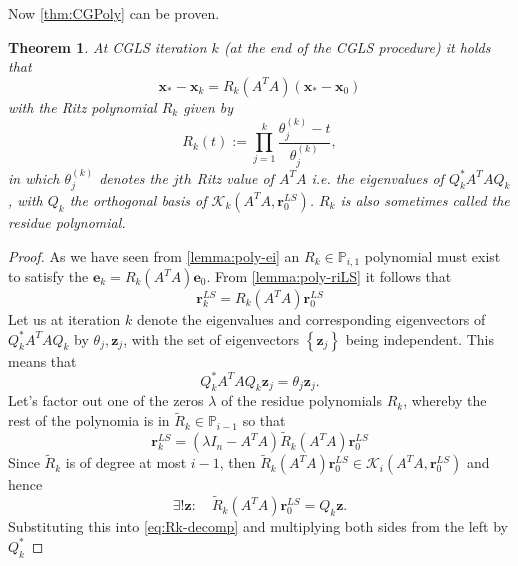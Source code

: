 \documentclass{article}
\newcommand{\mbf}[1]{\mathbf{#1}}
\newtheorem{theorem}{Theorem}
\begin{document}
	Now \autoref{thm:CGPoly} can be proven.
	\begin{theorem}\label{thm:CGPoly}
		At CGLS iteration $k$ (at the end of the CGLS procedure) it holds that
		$$\mathbf{x}_{\ast}-\mathbf{x}_k=R_k(A^TA)(\mathbf{x}_{\ast}-\mbf{x}_0)$$
		with the \emph{Ritz polynomial} $R_k$ given by
		$$R_k(t):=\prod_{j=1}^{k}\frac{\theta_j^{(k)}-t}{\theta_j^{(k)}},$$
		in which $\theta_j^{(k)}$ denotes the $jth$ Ritz value of $A^{T}A$ i.e. the eigenvalues of $Q_k^{\ast}A^{T}AQ_k$, with $Q_k$ the orthogonal basis of $\mathcal{K}_k(A^{T}A,\mathbf{r}_0^{LS})$. $R_k$ is also sometimes called the residue polynomial.
	\end{theorem}
	\begin{proof}
		As we have seen from \autoref{lemma:poly-ei} an $R_k\in \mathbb{P}_{i,1}$ polynomial must exist to satisfy the $\textbf{e}_k = R_k \left(A^T A \right) \textbf{e}_0$. From \autoref{lemma:poly-riLS} it follows that
		\begin{equation}
			\mathbf{r}_k^{LS}=R_k\left(A^TA\right)\mathbf{r}_0^{LS} 
		\end{equation}
		Let us at iteration $k$ denote the eigenvalues and corresponding eigenvectors of $Q_k^{\ast}A^{T}AQ_k$ by $\theta_j, \textbf{z}_j$, with the set of eigenvectors $\left\lbrace \textbf{z}_j \right\rbrace$ being independent. This means that 
		\begin{equation}
			Q_k^{\ast}A^{T} A Q_k \textbf{z}_j = \theta_j \textbf{z}_j. %
		\end{equation}
		Let's factor out one of the zeros $\lambda$ of the residue polynomials $R_k$, whereby the rest of the polynomia is in $\tilde{R}_k \in \mathbb{P}_{i-1}$ so that
		\begin{equation}\label{eq:Rk-decomp}
			\mathbf{r}_k^{LS}=\left(\lambda I_{n} - A^T A \right)\tilde{R}_k\left(A^TA\right)\mathbf{r}_0^{LS}
		\end{equation}
		Since $\tilde{R}_k$ is of degree at most $i-1$, then $\tilde{R}_k\left(A^TA\right)\textbf{r}_0^{LS} \in \mathcal{K}_i \left(A^T A,\textbf{r}_0^{LS} \right)$ and hence
		\begin{equation}
			\exists! \textbf{z}: \quad \tilde{R}_k\left(A^TA\right)\textbf{r}_0^{LS} = Q_k \textbf{z}.
		\end{equation}
		Substituting this into \autoref{eq:Rk-decomp} and multiplying both sides from the left by $Q_k^\ast$

\end{proof}
\end{document}
